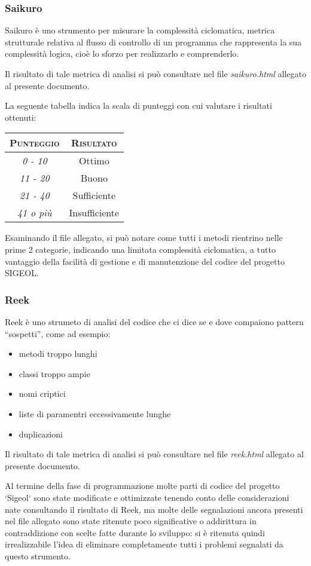 \documentclass[11pt,a4paper]{article}
\begin{document}
\subsubsection{Saikuro}
Saikuro è uno strumento per misurare la complessità ciclomatica, metrica strutturale relativa al flusso di controllo di un programma che rappresenta la sua complessità logica, cioè lo sforzo per realizzarlo e comprenderlo.

Il risultato di tale metrica di analisi si può consultare nel file \textit{saikuro.html} allegato al presente documento.

La seguente tabella indica la scala di punteggi con cui valutare i risultati ottenuti:
\begin{center}
\begin{tabular}{|c|c|}
\hline
\textsc{Punteggio} & \textsc{Risultato} \\
\hline
\hline
\textit{0 - 10} & Ottimo  \\
\hline
\textit{11 - 20} & Buono  \\
\hline
\textit{21 - 40} & Sufficiente  \\
\hline
\textit{41 o più} & Insufficiente  \\
\hline
\end{tabular}
\end{center}
Esaminando il file allegato, si può notare come tutti i metodi rientrino nelle prime 2 categorie, indicando una limitata complessità ciclomatica, a tutto vantaggio della facilità di gestione e di manutenzione del codice del progetto SIGEOL.
\subsubsection{Reek}
Reek è uno strumeto di analisi del codice che ci dice se e dove compaiono pattern “sospetti”, come ad esempio:
\begin{itemize}
 \item metodi troppo lunghi
 \item classi troppo ampie
 \item nomi criptici
 \item liste di paramentri eccessivamente lunghe
 \item duplicazioni
\end{itemize}
Il risultato di tale metrica di analisi si può consultare nel file \textit{reek.html} allegato al presente documento.

Al termine della fase di programmazione molte parti di codice del progetto `Sigeol` sono state modificate e ottimizzate tenendo conto delle considerazioni nate consultando il risultato di Reek, ma molte delle segnalazioni ancora presenti nel file allegato sono state ritenute poco significative o addirittura in contraddizione con scelte fatte durante lo sviluppo: si è ritenuta quindi irrealizzabile l'idea di eliminare completamente tutti i problemi segnalati da questo strumento.
\end{document}
